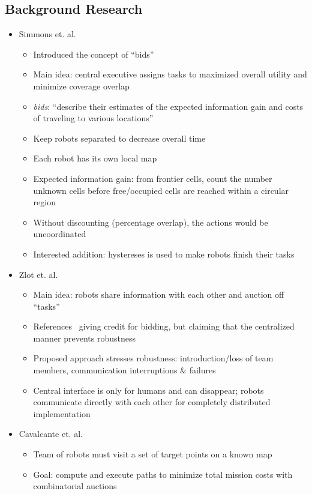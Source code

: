 \documentclass[conference]{IEEEURAI}
\begin{document}
\subsection*{Background Research}
\begin{itemize}
	\item Simmons et. al.~\cite{SimApfBurFoxMooThrYou00}
	\begin{itemize}
		\item Introduced the concept of ``bids''
		\item Main idea: central executive assigns tasks to maximized overall utility and minimize coverage overlap
		\item \emph{bids}: ``describe their estimates of the expected information gain and costs of traveling to various locations''
		\item Keep robots separated to decrease overall time
		\item Each robot has its own local map
		\item Expected information gain: from frontier cells, count the number unknown cells before free/occupied cells are reached within a circular region
		\item Without discounting (percentage overlap), the actions would be uncoordinated
		\item Interested addition: hystereses is used to make robots finish their tasks
	\end{itemize}
	\item Zlot et. al.~\cite{ZloSteDiaTha02}
	\begin{itemize}
		\item Main idea: robots share information with each other and auction off ``tasks'' 
		\item References~\cite{SimApfBurFoxMooThrYou00} giving credit for bidding, but claiming that the centralized manner prevents robustness
		\item Proposed approach stresses robustness: introduction/loss of team members, communication interruptions \& failures
		\item Central interface is only for humans and can disappear; robots communicate directly with each other for completely distributed implementation
	\end{itemize}
	\item Cavalcante et. al.~\cite{CavNorCha13}
	\begin{itemize}
		\item Team of robots must visit a set of target points on a known map
		\item Goal: compute and execute paths to minimize total mission costs with combinatorial auctions

\end{itemize}
\end{itemize}
\end{document}
